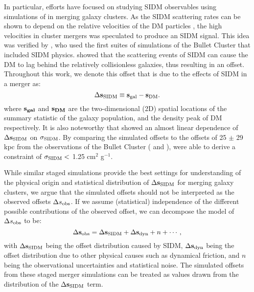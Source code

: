 In particular, efforts have focused on studying SIDM observables 
using simulations of in merging galaxy clusters.
As the SIDM scattering rates can be shown to depend on the 
relative velocities of the DM particles \citep{Markevitch2004}, the high velocities 
in cluster mergers was speculated to produce an SIDM signal. This idea was verified by 
\cite{Randall2008d}, who used the first suites of simulations of the
Bullet Cluster that included SIDM physics. 
\cite{Randall2008d} showed that the scattering events of SIDM can cause the DM
to lag behind the relatively collisionless galaxies, thus resulting in an offset.
Throughout this work, we denote this offset that is due to the effects of SIDM
in a merger as:
\begin{equation}
	\Delta {\bf s}_{{\rm SIDM}} \equiv {\bf s}_{\rm gal} - {\bf s}_{\rm DM}.
	\label{eq:offset}
\end{equation}
where $\bf{s}_{gal}$ and $\bf{s}_{DM}$ are the two-dimensional (2D) spatial
locations of the summary statistic of the galaxy population, and the density
peak of DM respectively. 
It is also noteworthy that \cite{Randall2008d} showed an almost linear dependence of
$\Delta {\bf s}_{{\rm SIDM}}$ on $\sigma_{\rm SIDM}$. 
By comparing the simulated offsets to the offsets of 25 $\pm$ 29 kpc from 
the observations of the Bullet Cluster
(\citealt{Markevitch2004} and \citealt{Bradac2006b}),
\cite{Randall2008d} were able to derive a constraint of $\sigma_{\rm SIDM} <$ 
1.25 cm$^2$ g$^{-1}$.  

While similar staged simulations provide the best settings 
for understanding of the physical origin and statistical distribution of $\Delta {\bf s}_{{\rm SIDM}}$
for merging galaxy clusters, 
we argue that the simulated offsets should not be interpreted as the observed
offsets $\Delta s_{\rm obs}$.
If we assume (statistical) independence of 
the different possible contributions of the observed 
offset, we can decompose the model of $\Delta s_{\rm obs}$ to be:
\begin{equation}
	\Delta {\bf s}_{\rm obs} = \Delta {\bf s}_{{\rm SIDM}} + \Delta {\bf s}_{\rm dyn} + n + \cdots,
	\label{eq:signal_and_noise}
\end{equation}
with $\Delta {\bf s}_{{\rm SIDM}}$ being the offset distribution caused by SIDM, 
$\Delta {\bf s}_{\rm dyn}$ being the offset distribution due to other physical causes such as
dynamical friction, and $n$ being the observational uncertainties and statistical noise.
The simulated offsets from these staged merger simulations can be treated as 
values drawn from the distribution of the $\Delta {\bf s}_{{\rm SIDM}}$ term.

